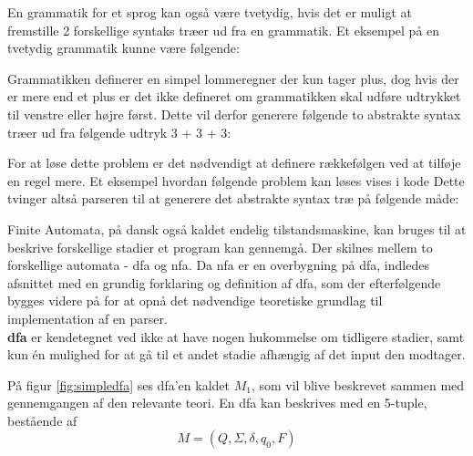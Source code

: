 

\noindent En grammatik for et sprog kan også være tvetydig, hvis det er muligt at fremstille 2 forskellige syntaks træer ud fra en grammatik. Et eksempel på en tvetydig grammatik kunne være følgende:




\noindent Grammatikken definerer en simpel lommeregner der kun tager plus, dog hvis der er mere end et plus er det ikke defineret om grammatikken skal udføre udtrykket til venstre eller højre først. Dette vil derfor generere følgende to abstrakte syntax træer ud fra følgende udtryk 3 + 3 + 3: 

\noindent For at løse dette problem er det nødvendigt at definere rækkefølgen ved at tilføje en regel mere. Et eksempel hvordan følgende problem kan løses vises i kode 
Dette tvinger altså parseren til at generere det abstrakte syntax træ på følgende måde:

Finite Automata, på dansk også kaldet endelig tilstandsmaskine, kan bruges til at beskrive forskellige stadier et program kan gennemgå. Der skilnes mellem to forskellige automata - \gls{dfa} og \gls{nfa}. Da \gls{nfa} er en overbygning på \gls{dfa}, indledes afsnittet med en grundig forklaring og definition af \gls{dfa}, som der efterfølgende bygges videre på for at opnå det nødvendige teoretiske grundlag til implementation af en parser.\\

\noindent \textbf{\gls{dfa}} er kendetegnet ved ikke at have nogen hukommelse om tidligere stadier, samt kun én mulighed for at gå til et andet stadie afhængig af det input den modtager.


\noindent På figur \ref{fig:simpledfa} ses \gls{dfa}'en kaldet $M_1$, som vil blive beskrevet sammen med gennemgangen af den relevante teori. En \gls{dfa} kan beskrives med en 5-tuple, bestående af \[M = (Q, \Sigma, \delta, q_0, F)\]

